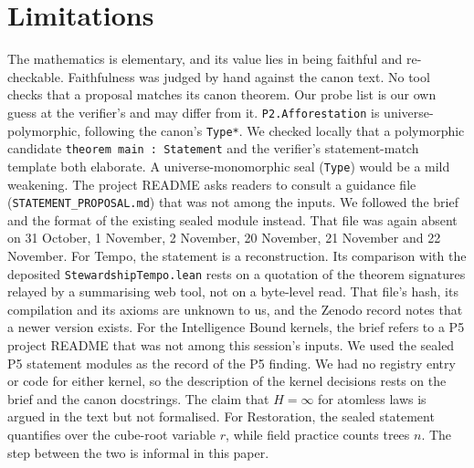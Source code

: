 \documentclass[11pt]{article}
\theoremstyle{definition}
\theoremstyle{remark}
\begin{document}
\section{Limitations}
The mathematics is elementary, and its value lies in being faithful and re-checkable.
Faithfulness was judged by hand against the canon text. No tool checks that a proposal matches its canon theorem.
Our probe list is our own guess at the verifier's and may differ from it.
\texttt{P2.Afforestation} is universe-polymorphic, following the canon's \texttt{Type*}. We checked locally that a polymorphic
candidate \texttt{theorem main : Statement} and the verifier's statement-match template both elaborate.
A universe-monomorphic seal (\texttt{Type}) would be a mild weakening.
The project README asks readers to consult a guidance file (\texttt{STATEMENT\_PROPOSAL.md}) that was not among the inputs.
We followed the brief and the format of the existing sealed module instead. That file was again absent on 31 October, 1 November, 2 November, 20 November, 21 November and 22 November.
For Tempo, the statement is a reconstruction. Its comparison with the deposited \texttt{StewardshipTempo.lean} rests on a
quotation of the theorem signatures relayed by a summarising web tool, not on a byte-level read. That file's hash, its
compilation and its axioms are unknown to us, and the Zenodo record notes that a newer version exists.
For the Intelligence Bound kernels, the brief refers to a P5 project README that was not among this session's inputs. We used the
sealed P5 statement modules as the record of the P5 finding. We had no registry entry or code for either kernel, so the description of
the kernel decisions rests on the brief and the canon docstrings. The claim that $H=\infty$ for atomless laws is argued in the text
but not formalised.
For Restoration, the sealed statement quantifies over the cube-root variable $r$, while field practice counts trees $n$.
The step between the two is informal in this paper.
\end{document}
